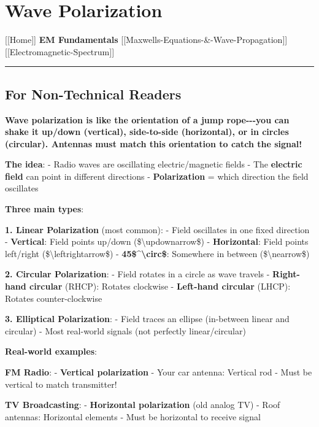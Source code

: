 \section{Wave Polarization}\label{wave-polarization}

{[}{[}Home{]}{]} \textbar{} \textbf{EM Fundamentals} \textbar{}
{[}{[}Maxwell\textquotesingle s-Equations-\&-Wave-Propagation{]}{]}
\textbar{} {[}{[}Electromagnetic-Spectrum{]}{]}

\begin{center}\rule{0.5\linewidth}{0.5pt}\end{center}

\subsection{\texorpdfstring{ For Non-Technical
Readers}{ For Non-Technical Readers}}\label{for-non-technical-readers}

\textbf{Wave polarization is like the orientation of a jump
rope-\/-\/-you can shake it up/down (vertical), side-to-side
(horizontal), or in circles (circular). Antennas must match this
orientation to catch the signal!}

\textbf{The idea}: - Radio waves are oscillating electric/magnetic
fields - The \textbf{electric field} can point in different directions -
\textbf{Polarization} = which direction the field oscillates

\textbf{Three main types}:

\textbf{1. Linear Polarization} (most common): - Field oscillates in one
fixed direction - \textbf{Vertical}: Field points up/down
(\$\textbackslash updownarrow\$) - \textbf{Horizontal}: Field points
left/right (\$\textbackslash leftrightarrow\$) -
\textbf{45\$\^{}\textbackslash circ\$}: Somewhere in between
(\$\textbackslash nearrow\$)

\textbf{2. Circular Polarization}: - Field rotates in a circle as wave
travels - \textbf{Right-hand circular} (RHCP): Rotates clockwise -
\textbf{Left-hand circular} (LHCP): Rotates counter-clockwise

\textbf{3. Elliptical Polarization}: - Field traces an ellipse
(in-between linear and circular) - Most real-world signals (not
perfectly linear/circular)

\textbf{Real-world examples}:

\textbf{FM Radio}: - \textbf{Vertical polarization} - Your car antenna:
Vertical rod - Must be vertical to match transmitter!

\textbf{TV Broadcasting}: - \textbf{Horizontal polarization} (old analog
TV) - Roof antennas: Horizontal elements - Must be horizontal to receive
signal

